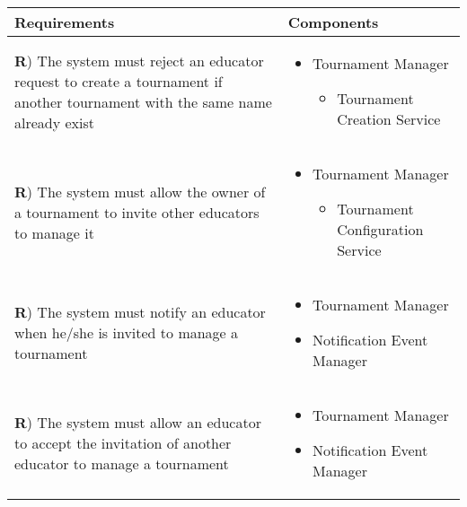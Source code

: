 \documentclass[../DD.tex]{subfiles}
\newcounter{rown}
\newcommand{\rowIndex}{\arabic{rown}\stepcounter{rown}}
\begin{document}
    \begin{table}[h!]
        \begin{center}
            \hspace*{-2cm}
            \begin{tabular}{|m{20em}|m{20em}|}
            \hline
            \textbf{Requirements} & \textbf{Components}\\
            \hline
            \textbf{R\rowIndex}) The system must reject an educator request to create a tournament if another tournament with the same name already exist & \begin{itemize}
                \item  Tournament Manager
                \begin{itemize}
                    \item Tournament Creation Service
                \end{itemize}
            \end{itemize}\\
            \hline
            \textbf{R\rowIndex}) The system must allow the owner of a tournament to invite other educators to manage it & \begin{itemize}
                \item  Tournament Manager
                \begin{itemize}
                    \item Tournament Configuration Service
                \end{itemize}
            \end{itemize}\\
            \hline
            \textbf{R\rowIndex}) The system must notify an educator when he/she is invited to manage a tournament & \begin{itemize}
                \item Tournament Manager
                \item Notification Event Manager
            \end{itemize}\\
            \hline
            \textbf{R\rowIndex}) The system must allow an educator to accept the invitation of another educator to manage a tournament & \begin{itemize}
                \item Tournament Manager
                \item Notification Event Manager 

\end{itemize}
\end{tabular}
\end{center}
\end{table}
\end{document}
